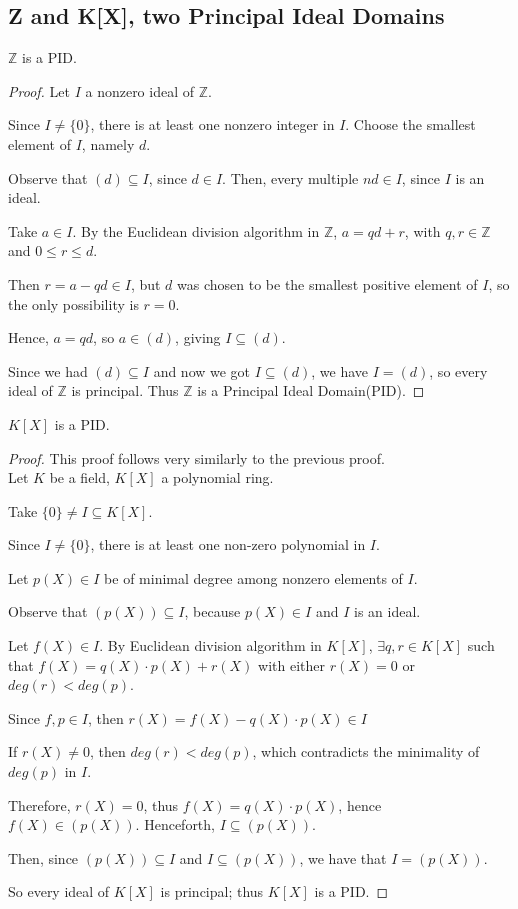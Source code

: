 \documentclass{article}
\theoremstyle{definition}
\newenvironment{lemma}[1]
{\renewcommand\theinnerlemma{#1}\innerlemma}
{\endinnerlemma}
\begin{document}
\subsection{Z and K[X], two Principal Ideal Domains}


\begin{lemma}{}
  $\mathbb{Z}$ is a PID.
\end{lemma}
\begin{proof}
  Let $I$ a nonzero ideal of $\mathbb{Z}$.

  Since $I \neq \{0\}$, there is at least one nonzero integer in $I$. Choose the smallest element of $I$, namely $d$.

  Observe that $(d) \subseteq I$, since $d \in I$. Then, every multiple $nd \in I$, since $I$ is an ideal.

  Take $a \in I$. By the Euclidean division algorithm in $\mathbb{Z}$, $a=qd+r$, with $q,r \in \mathbb{Z}$ and $0 \leq r \leq d$.

  Then $r = a - qd \in I$, but $d$ was chosen to be the smallest positive element of $I$, so the only possibility is $r=0$.

  Hence, $a=qd$, so $a \in (d)$, giving $I \subseteq (d)$.

  Since we had $(d) \subseteq I$ and now we got $I \subseteq (d)$, we have $I = (d)$, so every ideal of $\mathbb{Z}$ is principal. Thus $\mathbb{Z}$ is a Principal Ideal Domain(PID).
\end{proof}

\begin{lemma}{}
  $K[X]$ is a PID.
\end{lemma}
\begin{proof}
  This proof follows very similarly to the previous proof.\\

  Let $K$ be a field, $K[X]$ a polynomial ring.

  Take $\{0\} \neq I \subseteq K[X]$.

  Since $I \neq \{0\}$, there is at least one non-zero polynomial in $I$.

  Let $p(X) \in I$ be of minimal degree among nonzero elements of $I$.

  Observe that $(p(X)) \subseteq I$, because $p(X) \in I$ and $I$ is an ideal.

  Let $f(X) \in I$. By Euclidean division algorithm in $K[X]$, $\exists q, r \in K[X]$ such that $f(X) = q(X) \cdot p(X) + r(X)$ with either $r(X)=0$ or $deg(r) < deg(p)$.

  Since $f,p \in I$, then $r(X) = f(X) - q(X)\cdot p(X) \in I$

  If $r(X) \neq 0$, then $deg(r) < deg(p)$, which contradicts the minimality of $deg(p)$ in $I$.

  Therefore, $r(X)=0$, thus $f(X)=q(X)\cdot p(X)$, hence $f(X) \in (p(X))$.
  Henceforth, $I \subseteq (p(X))$.

  Then, since $(p(X)) \subseteq I$ and $I \subseteq (p(X))$, we have that $I = (p(X))$.

  So every ideal of $K[X]$ is principal; thus $K[X]$ is a PID.

\end{proof}
\end{document}
